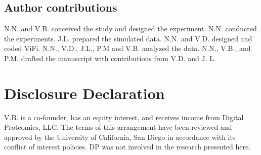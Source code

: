 \documentclass[11pt]{article}
\begin{document}

\subsection*{Author contributions}

N.N. and V.B. conceived the study and designed the experiment.  N.N. conducted the experiments.  J.L. prepared the simulated data.  N.N. and V.D. designed and coded ViFi.  N.N., V.D., J.L., P.M and V.B. analyzed the data.  N.N., V.B., and P.M. drafted the manuscript with contributions from V.D. and J. L.  


\section*{Disclosure Declaration}
V.B. is a co-founder, has an equity interest, and receives income from Digital Proteomics, LLC. The terms of this arrangement have been reviewed and approved by the University of California, San Diego in accordance with its conflict of interest policies. DP was not involved in the research presented here.


%
%
%
%
%
%
%

%
%

%
\def\bibfont{\normalsize}

%
\end{document}
